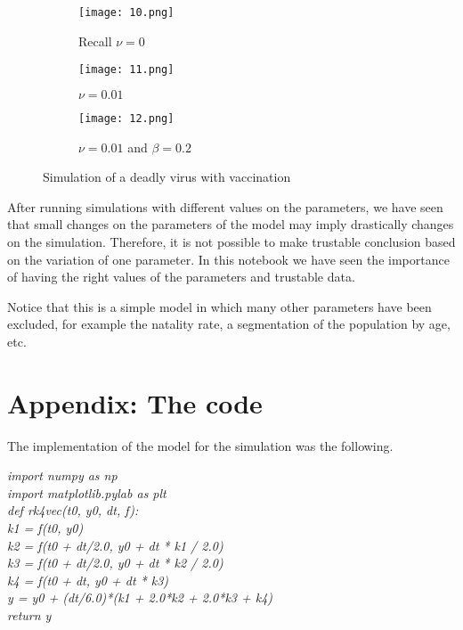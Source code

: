 \documentclass[14pt]{amsart}
\begin{document}
\begin{figure}[h!]
  \centering
  \begin{subfigure}[b]{0.4\linewidth}
    \texttt{[image: 10.png]}
    \caption{Recall $\nu=0$}
  \end{subfigure}
  \begin{subfigure}[b]{0.4\linewidth}
    \texttt{[image: 11.png]}
    \caption{$\nu=0.01$}
  \end{subfigure}
    \begin{subfigure}[b]{0.4\linewidth}
    \texttt{[image: 12.png]}
    \caption{$\nu=0.01$ and $\beta=0.2$}
  \end{subfigure}
  \caption{Simulation of a deadly virus with vaccination}
\end{figure}



After running simulations with different values on the parameters, we have seen that small changes on the parameters of the model may imply drastically changes on the simulation. Therefore, it is not possible to make trustable conclusion based on the variation of one parameter. In this notebook we have seen the importance of having the right values of the parameters and trustable data. 

Notice that this is a simple model in which many other parameters have been excluded, for example the natality rate, a segmentation of the population by age, etc.



\section{Appendix: The code}

The implementation of the model for the simulation was the following.

\noindent \textit{import numpy as np}\\
\textit{import matplotlib.pylab as plt}\\


\noindent \textit{def rk4vec(t0, y0, dt, f):}\\
\indent \textit{k1 = f(t0, y0)}\\
\indent \textit{k2 = f(t0 + dt/2.0, y0 + dt * k1 / 2.0)}\\
\indent \textit{k3 = f(t0 + dt/2.0, y0 + dt * k2 / 2.0)}\\
\indent \textit{k4 = f(t0 + dt, y0 + dt * k3)}\\
\indent \textit{y = y0 + (dt/6.0)*(k1 + 2.0*k2 + 2.0*k3 + k4)}\\
\indent \textit{return y}\\
\end{document}
